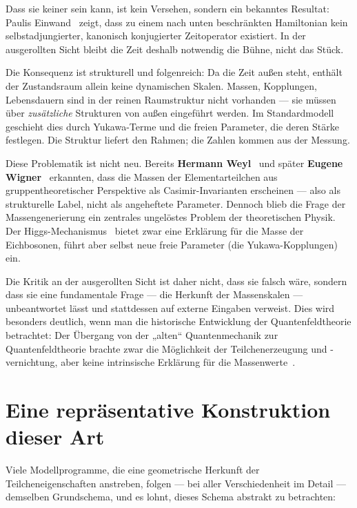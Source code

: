 \documentclass[11pt,a4paper]{article}
\begin{document}
Dass sie keiner sein kann, ist kein Versehen, sondern ein bekanntes Resultat: Paulis Einwand~\cite{Pauli1933} zeigt, dass zu einem nach unten beschränkten Hamiltonian kein selbstadjungierter, kanonisch konjugierter Zeitoperator existiert. In der ausgerollten Sicht bleibt die Zeit deshalb notwendig die Bühne, nicht das Stück.

Die Konsequenz ist strukturell und folgenreich: Da die Zeit außen steht, enthält der Zustandsraum allein keine dynamischen Skalen. Massen, Kopplungen, Lebensdauern sind in der reinen Raumstruktur nicht vorhanden --- sie müssen über \emph{zusätzliche} Strukturen von außen eingeführt werden. Im Standardmodell geschieht dies durch Yukawa-Terme und die freien Parameter, die deren Stärke festlegen. Die Struktur liefert den Rahmen; die Zahlen kommen aus der Messung.

Diese Problematik ist nicht neu. Bereits \textbf{Hermann Weyl}~\cite{Weyl1928} und später \textbf{Eugene Wigner}~\cite{Wigner1939} erkannten, dass die Massen der Elementarteilchen aus gruppentheoretischer Perspektive als Casimir-Invarianten erscheinen --- also als strukturelle Label, nicht als angeheftete Parameter. Dennoch blieb die Frage der Massengenerierung ein zentrales ungelöstes Problem der theoretischen Physik. Der Higgs-Mechanismus~\cite{Higgs1964,Englert1964} bietet zwar eine Erklärung für die Masse der Eichbosonen, führt aber selbst neue freie Parameter (die Yukawa-Kopplungen) ein.

Die Kritik an der ausgerollten Sicht ist daher nicht, dass sie falsch wäre, sondern dass sie eine fundamentale Frage --- die Herkunft der Massenskalen --- unbeantwortet lässt und stattdessen auf externe Eingaben verweist. Dies wird besonders deutlich, wenn man die historische Entwicklung der Quantenfeldtheorie betrachtet: Der Übergang von der „alten`` Quantenmechanik zur Quantenfeldtheorie brachte zwar die Möglichkeit der Teilchenerzeugung und -vernichtung, aber keine intrinsische Erklärung für die Massenwerte~\cite{Weinberg1995}.

\section{Eine repräsentative Konstruktion dieser Art}

Viele Modellprogramme, die eine geometrische Herkunft der Teilcheneigenschaften anstreben, folgen --- bei aller Verschiedenheit im Detail --- demselben Grundschema, und es lohnt, dieses Schema abstrakt zu betrachten:
\end{document}
